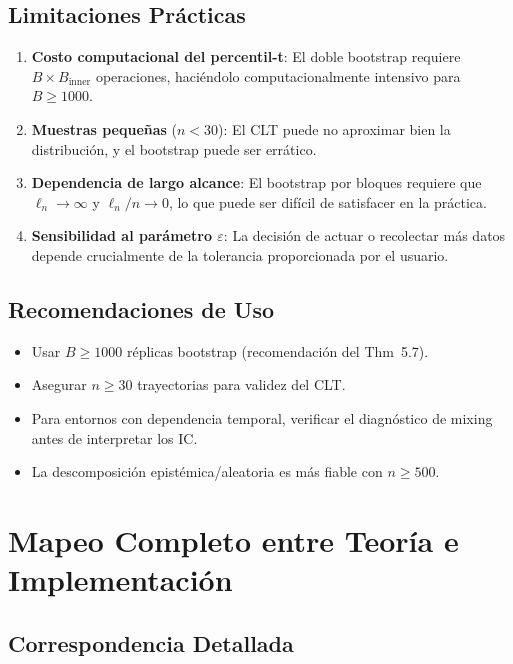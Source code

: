 \documentclass[12pt,a4paper]{article}
\begin{document}
\subsection{Limitaciones Prácticas}

\begin{enumerate}
	\item \textbf{Costo computacional del percentil-t}: El doble bootstrap requiere $B \times B_{\text{inner}}$ operaciones, haciéndolo computacionalmente intensivo para $B \geq 1000$.
	\item \textbf{Muestras pequeñas} ($n < 30$): El CLT puede no aproximar bien la distribución, y el bootstrap puede ser errático.
	\item \textbf{Dependencia de largo alcance}: El bootstrap por bloques requiere que $\ell_n \to \infty$ y $\ell_n/n \to 0$, lo que puede ser difícil de satisfacer en la práctica.
	\item \textbf{Sensibilidad al parámetro $\varepsilon$}: La decisión de actuar o recolectar más datos depende crucialmente de la tolerancia proporcionada por el usuario.
\end{enumerate}

\subsection{Recomendaciones de Uso}

\begin{itemize}
	\item Usar $B \geq 1000$ réplicas bootstrap (recomendación del Thm~5.7).
	\item Asegurar $n \geq 30$ trayectorias para validez del CLT.
	\item Para entornos con dependencia temporal, verificar el diagnóstico de mixing antes de interpretar los IC.
	\item La descomposición epistémica/aleatoria es más fiable con $n \geq 500$.
\end{itemize}

\newpage

\section{Mapeo Completo entre Teoría e Implementación}

\subsection{Correspondencia Detallada}
\end{document}
